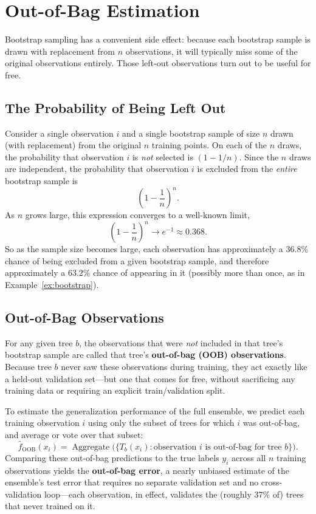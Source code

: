 \documentclass[12pt,a4paper]{article}
\begin{document}
\section{Out-of-Bag Estimation}

Bootstrap sampling has a convenient side effect: because each bootstrap sample is drawn with replacement from $n$ observations, it will typically miss some of the original observations entirely. Those left-out observations turn out to be useful for free.

\subsection{The Probability of Being Left Out}

Consider a single observation $i$ and a single bootstrap sample of size $n$ drawn (with replacement) from the original $n$ training points. On each of the $n$ draws, the probability that observation $i$ is \emph{not} selected is $(1 - 1/n)$. Since the $n$ draws are independent, the probability that observation $i$ is excluded from the \emph{entire} bootstrap sample is
$$
\left(1 - \frac{1}{n}\right)^n.
$$
As $n$ grows large, this expression converges to a well-known limit,
$$
\left(1 - \frac{1}{n}\right)^n \longrightarrow e^{-1} \approx 0.368.
$$
So as the sample size becomes large, each observation has approximately a $36.8\%$ chance of being excluded from a given bootstrap sample, and therefore approximately a $63.2\%$ chance of appearing in it (possibly more than once, as in Example~\ref{ex:bootstrap}).

\subsection{Out-of-Bag Observations}

For any given tree $b$, the observations that were \emph{not} included in that tree's bootstrap sample are called that tree's \textbf{out-of-bag (OOB) observations}. Because tree $b$ never saw these observations during training, they act exactly like a held-out validation set---but one that comes for free, without sacrificing any training data or requiring an explicit train/validation split.

To estimate the generalization performance of the full ensemble, we predict each training observation $i$ using only the subset of trees for which $i$ was out-of-bag, and average or vote over that subset:
$$
\hat f_{\text{OOB}}(x_i) = \operatorname{Aggregate}\Big(\{T_b(x_i) : \text{observation } i \text{ is out-of-bag for tree } b\}\Big).
$$
Comparing these out-of-bag predictions to the true labels $y_i$ across all $n$ training observations yields the \textbf{out-of-bag error}, a nearly unbiased estimate of the ensemble's test error that requires no separate validation set and no cross-validation loop---each observation, in effect, validates the (roughly 37\% of) trees that never trained on it.
\end{document}

